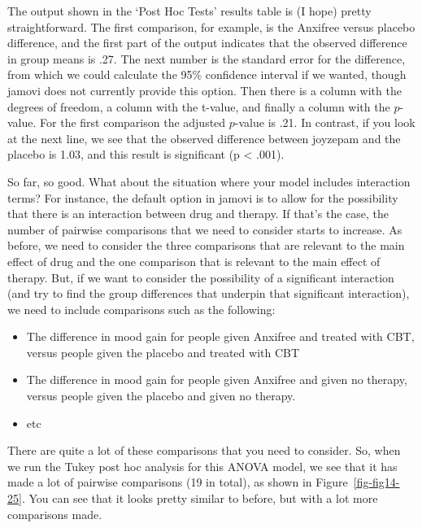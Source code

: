 \documentclass[
  a4paper,
]{book}
\providecommand{\tightlist}{%
  \setlength{\itemsep}{0pt}\setlength{\parskip}{0pt}}\usepackage{longtable,booktabs,array}
\begin{document}
The output shown in the `Post Hoc Tests' results table is (I hope)
pretty straightforward. The first comparison, for example, is the
Anxifree versus placebo difference, and the first part of the output
indicates that the observed difference in group means is .27. The next
number is the standard error for the difference, from which we could
calculate the 95\% confidence interval if we wanted, though jamovi does
not currently provide this option. Then there is a column with the
degrees of freedom, a column with the t-value, and finally a column with
the \(p\)-value. For the first comparison the adjusted \(p\)-value is
.21. In contrast, if you look at the next line, we see that the observed
difference between joyzepam and the placebo is 1.03, and this result is
significant (p \textless{} .001).

So far, so good. What about the situation where your model includes
interaction terms? For instance, the default option in jamovi is to
allow for the possibility that there is an interaction between drug and
therapy. If that's the case, the number of pairwise comparisons that we
need to consider starts to increase. As before, we need to consider the
three comparisons that are relevant to the main effect of drug and the
one comparison that is relevant to the main effect of therapy. But, if
we want to consider the possibility of a significant interaction (and
try to find the group differences that underpin that significant
interaction), we need to include comparisons such as the following:

\begin{itemize}
\tightlist
\item
  The difference in mood gain for people given Anxifree and treated with
  CBT, versus people given the placebo and treated with CBT
\item
  The difference in mood gain for people given Anxifree and given no
  therapy, versus people given the placebo and given no therapy.
\item
  etc
\end{itemize}

There are quite a lot of these comparisons that you need to consider.
So, when we run the Tukey post hoc analysis for this ANOVA model, we see
that it has made a lot of pairwise comparisons (19 in total), as shown
in Figure~\ref{fig-fig14-25}. You can see that it looks pretty similar
to before, but with a lot more comparisons made.
\end{document}
